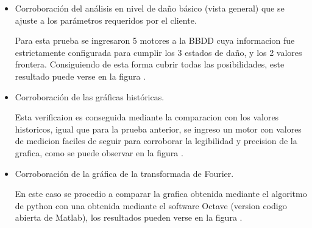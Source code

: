 \begin{itemize}
    \item Corroboración del análisis en nivel de daño básico (vista general)
        que se ajuste a los parámetros requeridos por el cliente.

        Para esta prueba se ingresaron 5 motores a la BBDD cuya informacion fue
        estrictamente configurada para cumplir los 3 estados de daño, y los
        2 valores frontera. Consiguiendo de esta forma cubrir todas las
        posibilidades, este resultado puede verse en la figura .

    \item Corroboración de las gráficas históricas.

        Esta verificaion es conseguida mediante la comparacion con los valores
        historicos, igual que para la prueba anterior, se ingreso un motor
        con valores de medicion faciles de seguir para corroborar la legibilidad
        y precision de la grafica, como se puede observar en la figura .

    \item Corroboración de la gráfica de la transformada de Fourier.

        En este caso se procedio a comparar la grafica obtenida mediante el
        algoritmo de python con una obtenida mediante el software Octave (version
        codigo abierta de Matlab), los resultados pueden verse en la figura .
\end{itemize}


